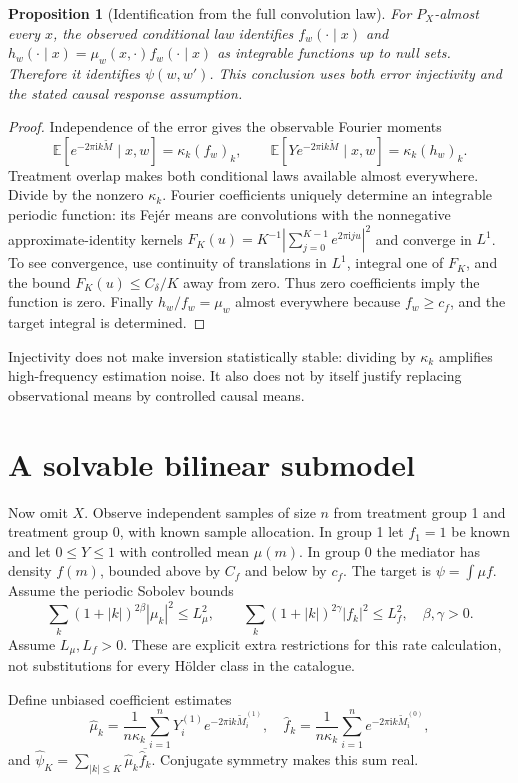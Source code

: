 \documentclass[11pt,a4paper]{article}
\newtheorem{proposition}[theorem]{Proposition}
\theoremstyle{definition}
\theoremstyle{remark}
\newcommand{\E}{\mathbb E}
\begin{document}
\begin{proposition}[Identification from the full convolution law]
For $P_X$-almost every $x$, the observed conditional law identifies $f_w(\cdot\mid x)$ and $h_w(\cdot\mid x)=\mu_w(x,\cdot)f_w(\cdot\mid x)$ as integrable functions up to null sets. Therefore it identifies $\psi(w,w')$. This conclusion uses both error injectivity and the stated causal response assumption.
\end{proposition}
\begin{proof}
Independence of the error gives the observable Fourier moments
\[
 \E[e^{-2\pi\mathrm i k\widetilde M}\mid x,w]=\kappa_k(f_w)_k,
 \qquad
 \E[Ye^{-2\pi\mathrm i k\widetilde M}\mid x,w]=\kappa_k(h_w)_k.
\]
Treatment overlap makes both conditional laws available almost everywhere. Divide by the nonzero $\kappa_k$. Fourier coefficients uniquely determine an integrable periodic function: its Fej\'er means are convolutions with the nonnegative approximate-identity kernels
$F_K(u)=K^{-1}|\sum_{j=0}^{K-1}e^{2\pi\mathrm i ju}|^2$ and converge in $L^1$. To see convergence, use continuity of translations in $L^1$, integral one of $F_K$, and the bound $F_K(u)\le C_\delta/K$ away from zero. Thus zero coefficients imply the function is zero. Finally $h_w/f_w=\mu_w$ almost everywhere because $f_w\ge c_f$, and the target integral is determined.
\end{proof}

Injectivity does not make inversion statistically stable: dividing by $\kappa_k$ amplifies high-frequency estimation noise. It also does not by itself justify replacing observational means by controlled causal means.
\section{A solvable bilinear submodel}
Now omit $X$. Observe independent samples of size $n$ from treatment group 1 and treatment group 0, with known sample allocation. In group 1 let $f_1=1$ be known and let $0\le Y\le1$ with controlled mean $\mu(m)$. In group 0 the mediator has density $f(m)$, bounded above by $C_f$ and below by $c_f$. The target is $\psi=\int\mu f$. Assume the periodic Sobolev bounds
\[
 \sum_k(1+|k|)^{2\beta}|\mu_k|^2\le L_\mu^2,
 \qquad
 \sum_k(1+|k|)^{2\gamma}|f_k|^2\le L_f^2,
 \quad \beta,\gamma>0. \tag{2}
\]
Assume $L_\mu,L_f>0$. These are explicit extra restrictions for this rate calculation, not substitutions for every H\"older class in the catalogue.

Define unbiased coefficient estimates
\[
 \hat\mu_k=\frac1{n\kappa_k}\sum_{i=1}^nY_i^{(1)}e^{-2\pi\mathrm i k\widetilde M_i^{(1)}},
 \quad
 \hat f_k=\frac1{n\kappa_k}\sum_{i=1}^ne^{-2\pi\mathrm i k\widetilde M_i^{(0)}},
\]
and $\hat\psi_K=\sum_{|k|\le K}\hat\mu_k\overline{\hat f_k}$. Conjugate symmetry makes this sum real.
\end{document}
